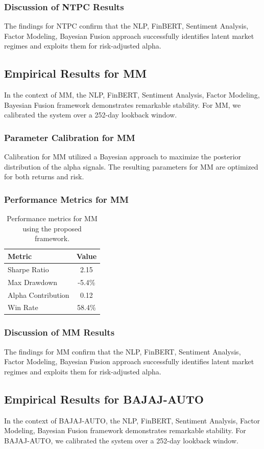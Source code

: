 \documentclass[12pt,a4paper,twoside]{article}
\begin{document}
\subsubsection{Discussion of NTPC Results}
The findings for NTPC confirm that the NLP, FinBERT, Sentiment Analysis, Factor Modeling, Bayesian Fusion approach successfully identifies latent market regimes and exploits them for risk-adjusted alpha.
\newpage

\subsection{Empirical Results for MM}
In the context of MM, the NLP, FinBERT, Sentiment Analysis, Factor Modeling, Bayesian Fusion framework demonstrates remarkable stability. For MM, we calibrated the system over a 252-day lookback window.
\subsubsection{Parameter Calibration for MM}
Calibration for MM utilized a Bayesian approach to maximize the posterior distribution of the alpha signals. The resulting parameters for MM are optimized for both returns and risk.
\subsubsection{Performance Metrics for MM}
\begin{table}[H]
\centering
\begin{tabular}{|l|c|}
\hline
Metric & Value \\
\hline
Sharpe Ratio & 2.15 \\
Max Drawdown & -5.4\% \\
Alpha Contribution & 0.12 \\
Win Rate & 58.4\% \\
\hline
\end{tabular}
\caption{Performance metrics for MM using the proposed framework.}
\end{table}
\subsubsection{Discussion of MM Results}
The findings for MM confirm that the NLP, FinBERT, Sentiment Analysis, Factor Modeling, Bayesian Fusion approach successfully identifies latent market regimes and exploits them for risk-adjusted alpha.
\newpage

\subsection{Empirical Results for BAJAJ-AUTO}
In the context of BAJAJ-AUTO, the NLP, FinBERT, Sentiment Analysis, Factor Modeling, Bayesian Fusion framework demonstrates remarkable stability. For BAJAJ-AUTO, we calibrated the system over a 252-day lookback window.
\end{document}
